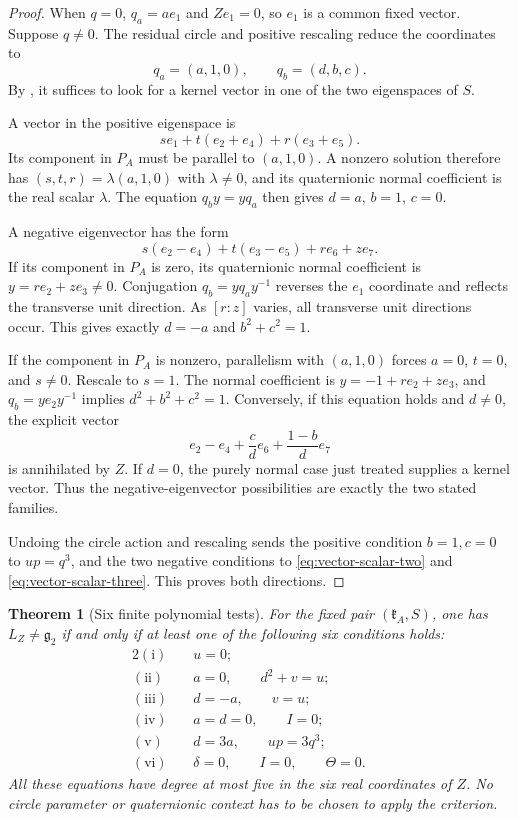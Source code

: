 \documentclass[11pt,a4paper]{article}
\newtheorem{theorem}{Theorem}[section]
\begin{document}
\begin{proof}
When $q=0$, $q_a=ae_1$ and $Ze_1=0$, so $e_1$ is a common fixed vector.  Suppose $q\ne0$.  The residual circle and positive rescaling reduce the coordinates to
\[
q_a=(a,1,0),\qquad q_b=(d,b,c).
\]
By , it suffices to look for a kernel vector in one of the two eigenspaces of $S$.

A vector in the positive eigenspace is
\[
s e_1+t(e_2+e_4)+r(e_3+e_5).
\]
Its component in $P_A$ must be parallel to $(a,1,0)$.  A nonzero solution therefore has $(s,t,r)=\lambda(a,1,0)$ with $\lambda\ne0$, and its quaternionic normal coefficient is the real scalar $\lambda$.  The equation $q_by=yq_a$ then gives $d=a$, $b=1$, $c=0$.

A negative eigenvector has the form
\[
s(e_2-e_4)+t(e_3-e_5)+r e_6+z e_7.
\]
If its component in $P_A$ is zero, its quaternionic normal coefficient is $y=r e_2+z e_3\ne0$.  Conjugation $q_b=yq_ay^{-1}$ reverses the $e_1$ coordinate and reflects the transverse unit direction.  As $[r:z]$ varies, all transverse unit directions occur.  This gives exactly $d=-a$ and $b^2+c^2=1$.

If the component in $P_A$ is nonzero, parallelism with $(a,1,0)$ forces $a=0$, $t=0$, and $s\ne0$.  Rescale to $s=1$.  The normal coefficient is $y=-1+r e_2+z e_3$, and $q_b=y e_2y^{-1}$ implies $d^2+b^2+c^2=1$.  Conversely, if this equation holds and $d\ne0$, the explicit vector
\[
e_2-e_4+\frac{c}{d}e_6+\frac{1-b}{d}e_7
\]
is annihilated by $Z$.  If $d=0$, the purely normal case just treated supplies a kernel vector.  Thus the negative-eigenvector possibilities are exactly the two stated families.

Undoing the circle action and rescaling sends the positive condition $b=1,c=0$ to $up=q^3$, and the two negative conditions to \eqref{eq:vector-scalar-two} and \eqref{eq:vector-scalar-three}.  This proves both directions.
\end{proof}

\begin{theorem}[Six finite polynomial tests]
\label{thm:scalar-classifier}
For the fixed pair $(\mathfrak k_A,S)$, one has $L_Z\ne\mathfrak g_2$ if and only if at least one of the following six conditions holds:
\begin{alignat}{2}
\mathrm{(i)}\quad &u=0; &&\nonumber\\
\mathrm{(ii)}\quad &a=0,\qquad d^2+v=u; &&\nonumber\\
\mathrm{(iii)}\quad &d=-a,\qquad v=u; &&\nonumber\\
\mathrm{(iv)}\quad &a=d=0,\qquad I=0; &&\label{eq:six-tests}\\
\mathrm{(v)}\quad &d=3a,\qquad up=3q^3; &&\nonumber\\
\mathrm{(vi)}\quad &\delta=0,\qquad I=0,\qquad\Theta=0. &&\nonumber
\end{alignat}
All these equations have degree at most five in the six real coordinates of $Z$.  No circle parameter or quaternionic context has to be chosen to apply the criterion.
\end{theorem}
\end{document}
